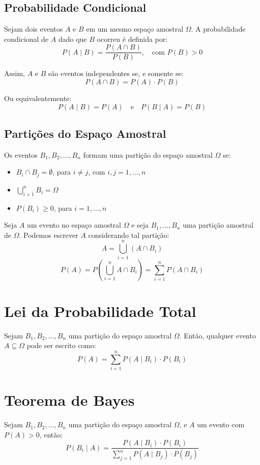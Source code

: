 \documentclass{article}
\begin{document}
\subsection{Probabilidade Condicional}

Sejam dois eventos $A$ e $B$ em um mesmo espaço amostral $\Omega$.  
A probabilidade condicional de $A$ dado que $B$ ocorreu é definida por:
    $$
    P(A \mid B) = \frac{P(A \cap B)}{P(B)}, \quad \text{com } P(B) > 0
    $$

Assim, $A$ e $B$ são eventos independentes se, e somente se:
    $$
    P(A \cap B) = P(A) \cdot P(B)
    $$

Ou equivalentemente:
    $$
    P(A \mid B) = P(A) \quad \text{e} \quad P(B \mid A) = P(B)
    $$

\subsection{Partições do Espaço Amostral}
Os eventos $B_1, B_2, \dots, B_n$ formam uma partição do espaço amostral $\Omega$ se:

\begin{itemize}
    \item $B_i \cap B_j = \emptyset$, para $i \neq j$, com $i, j = 1, \dots, n$
    \item $\bigcup_{i=1}^n B_i = \Omega$
    \item $P(B_i) \geq 0$, para $i = 1, \dots, n$
\end{itemize}

Seja $A$ um evento no espaço amostral $\Omega$ e seja $B_1, \dots, B_n$ uma partição amostral de $\Omega$. Podemos escrever $A$ considerando tal partição:
    $$
    A = \bigcup_{i=1}^n (A \cap B_i)
    $$
    $$
    P(A) = P\left( \bigcup_{i=1}^n A \cap B_i \right) = \sum_{i=1}^n P(A \cap B_i)
    $$

\section{Lei da Probabilidade Total}
Sejam $B_1, B_2, \dots, B_n$ uma partição do espaço amostral $\Omega$. Então, qualquer evento $A \subseteq \Omega$ pode ser escrito como:
    $$
    P(A) = \sum_{i=1}^n P(A \mid B_i) \cdot P(B_i)
    $$

\section{Teorema de Bayes}
Sejam $B_1, B_2, \dots, B_n$ uma partição do espaço amostral $\Omega$, e $A$ um evento com $P(A) > 0$, então:
    $$
    P(B_i \mid A) = \frac{P(A \mid B_i) \cdot P(B_i)}{\sum_{j=1}^n P(A \mid B_j) \cdot P(B_j)}
    $$
\end{document}
